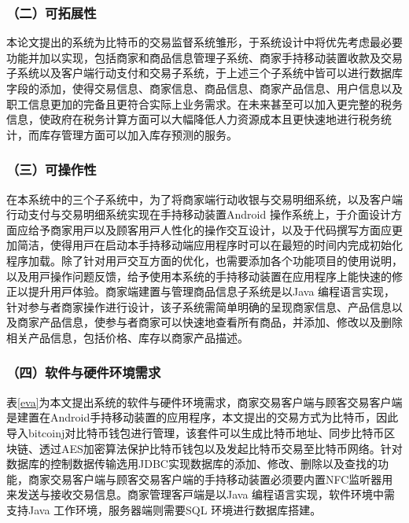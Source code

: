 	\subsubsection{（二）可拓展性}

	本论文提出的系统为比特币的交易监督系统雏形，于系统设计中将优先考虑最必要功能并加以实现，包括商家和商品信息管理子系统、商家手持移动装置收款及交易子系统以及客户端行动支付和交易子系统，于上述三个子系统中皆可以进行数据库字段的添加，使得交易信息、商家信息、商品信息、商家产品信息、用户信息以及职工信息更加的完备且更符合实际上业务需求。在未来甚⾄可以加⼊更完整的税务信息，使政府在税务计算⽅⾯可以大幅降低⼈⼒资源成本且更快速地进⾏税务统计，而库存管理⽅⾯可以加⼊库存预测的服务。

	\subsubsection{（三）可操作性}
	在本系统中的三个⼦系统中，为了将商家端⾏动收银与交易明细系统，以及客户端⾏动⽀付与交易明细系统实现在手持移动装置Android 操作系统上，于介⾯设计⽅⾯应给予商家⽤⼾以及顾客⽤⼾⼈性化的操作交互设计，以及于代码撰写⽅⾯应更加简洁，使得⽤⼾在启动本⼿持移动端应⽤程序时可以在最短的时间内完成初始化程序加载。除了针对⽤⼾交互⽅⾯的优化，也需要添加各个功能项⽬的使⽤说明，以及⽤⼾操作问题反馈，给予使用本系统的手持移动装置在应⽤程序上能快速的修正以提升⽤⼾体验。商家端建置与管理商品信息⼦系统是以Java 编程语⾔实现，针对参与者商家操作进⾏设计，该⼦系统需简单明确的呈现商家信息、产品信息以及商家产品信息，使参与者商家可以快速地查看所有商品，并添加、修改以及删除相关产品信息，包括价格、库存以商家产品描述。

	\subsubsection{（四）软件与硬件环境需求}
	表\ref{eva}为本文提出系统的软件与硬件环境需求，商家交易客户端与顾客交易客户端是建置在Android手持移动装置的应用程序，本文提出的交易方式为比特币，因此导入bitcoinj\supercite{Bitcoinclients}对比特币钱包进行管理，该套件可以生成比特币地址、同步比特币区块链、透过AES加密算法保护比特币钱包以及发起比特币交易至比特币网络。针对数据库的控制数据传输选用JDBC\supercite{JDBCdatabaseaccesswithJava:atutorialandannotatedreference}实现数据库的添加、修改、删除以及查找的功能，商家交易客户端与顾客交易客户端的手持移动装置必须要内置NFC监听器用来发送与接收交易信息。商家管理客⼾端是以Java 编程语⾔实现，软件环境中需⽀持Java ⼯作环境，服务器端则需要SQL 环境进行数据库搭建。


